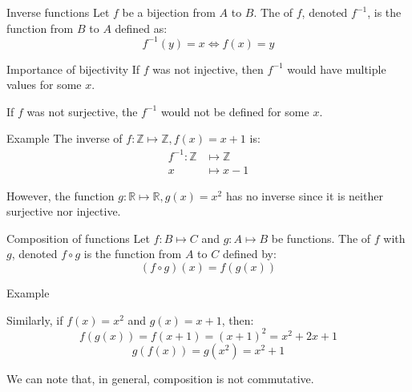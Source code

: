 \documentclass[a4paper]{article}
\begin{document}
\begin{parag}{Inverse functions}
    Let $f$ be a bijection from $A$ to $B$. The  of $f$, denoted $f^{-1}$, is the function from $B$ to $A$ defined as: 
    \[f^{-1}\left(y\right) = x \iff f\left(x\right) = y\]
    
    \begin{subparag}{Importance of bijectivity}
        If $f$ was not injective, then $f^{-1}$ would have multiple values for some $x$.

        If $f$ was not surjective, the $f^{-1}$ would not be defined for some $x$.
    \end{subparag}
    
    \begin{subparag}{Example}
        The inverse of $f: \mathbb{Z} \mapsto \mathbb{Z}, f\left(x\right) = x+1$ is: 
        \[\begin{split}
        f^{-1}: \mathbb{Z} &\longmapsto \mathbb{Z} \\
        x &\longmapsto x - 1
        \end{split}\]

        However, the function $g: \mathbb{R} \mapsto \mathbb{R}, g\left(x\right) = x^2$ has no inverse since it is neither surjective nor injective.
    \end{subparag}
\end{parag}

\begin{parag}{Composition of functions}
    Let $f: B \mapsto C$ and $g: A \mapsto B$ be functions. The  of $f$ with $g$, denoted $f \circ g$ is the function from $A$ to $C$ defined by: 
    \[\left(f \circ g\right)\left(x\right) = f\left(g\left(x\right)\right)\]

    \begin{subparag}{Example}

        Similarly, if $f\left(x\right) = x^2$ and $g\left(x\right) = x + 1$, then: 
        \[f\left(g\left(x\right)\right) = f\left(x + 1\right) = \left(x + 1\right)^2 = x^2 + 2x + 1\]
        \[g\left(f\left(x\right)\right) = g\left(x^2\right) = x^2 + 1\]

        We can note that, in general, composition is not commutative.
    \end{subparag}
\end{parag}
\end{document}
